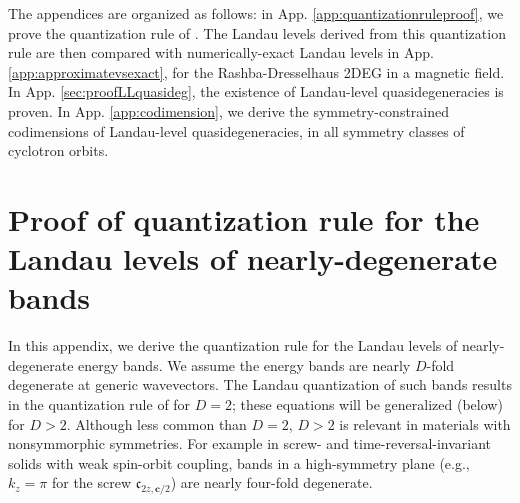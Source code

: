 \documentclass[aps, showpacs, twocolumn, notitlepage, superscriptaddress]{revtex4-1}
\begin{document}
\appendix

The appendices are organized as follows: in App. \ref{app:quantizationruleproof}, we prove the quantization rule of . The Landau levels derived from this quantization rule are then compared with numerically-exact Landau levels in App. \ref{app:approximatevsexact}, for the Rashba-Dresselhaus 2DEG in a magnetic field.  In App. \ref{sec:proofLLquasideg}, the existence of Landau-level quasidegeneracies is proven. In App. \ref{app:codimension}, we derive the symmetry-constrained codimensions of Landau-level quasidegeneracies, in all symmetry classes of cyclotron orbits. 

\section{Proof of quantization rule for the Landau levels of nearly-degenerate bands \label{app:quantizationruleproof}}

In this appendix, we derive the quantization rule for the Landau levels of nearly-degenerate energy bands. We assume the energy bands are nearly $D$-fold degenerate at generic wavevectors. The Landau quantization of such bands results in the quantization rule of   for $D=2$; these equations will be generalized (below) for $D>2$. Although less common than $D=2$, $D>2$ is relevant in  materials with nonsymmorphic symmetries. For example in screw- and time-reversal-invariant solids with weak spin-orbit coupling, bands in a high-symmetry plane (e.g., $k_z=\pi$ for the screw $\mathfrak{c}_{2z,\boldsymbol{c}/2}$)  are nearly four-fold degenerate.
\end{document}
